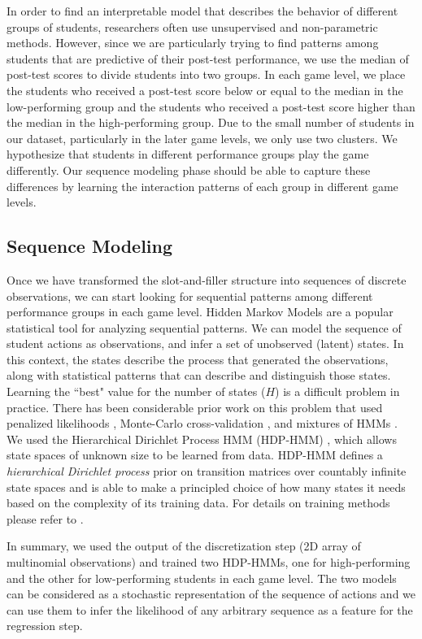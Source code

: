 \documentclass{sigchi}
\begin{document}
	In order to find an interpretable model that describes the behavior of different groups of students, researchers often use unsupervised and non-parametric methods. 
	However, since we are particularly trying to find patterns among students that are predictive of their post-test performance, we use the median of post-test scores to divide students into two groups. 
	In each game level, we place the students who received a post-test score below or equal to the median in the low-performing group and the students who received a post-test score higher than the median in the high-performing group.
	Due to the small number of students in our dataset, particularly in the later game levels, we only use two clusters. 
	We hypothesize that students in different performance groups play the game differently.
	Our sequence modeling phase should be able to capture
	these differences by learning the interaction patterns of each group in different game levels.

	
	\subsection{Sequence Modeling}
	Once we have transformed the slot-and-filler structure into sequences of discrete observations, we can start looking for sequential patterns among different performance groups in each game level.
	Hidden Markov Models are a popular statistical tool for analyzing sequential patterns.
	We can model the sequence of student actions as observations,
	and infer a set of unobserved (latent) states.
	In this context, the states describe the process that generated the observations, along with statistical patterns that can describe and distinguish those states.
	Learning the ``best" value for the number of states ($H$) is a difficult problem in practice. 
	There has been considerable prior work on this problem that used penalized likelihoods \cite{rabiner1989hmm}, Monte-Carlo cross-validation \cite{smyth1996clustering}, and mixtures of HMMs \cite{smyth1997clustering}.
	We used the Hierarchical Dirichlet Process HMM (HDP-HMM) \cite{fox2008hdp}, which allows state spaces of unknown size to be learned from data. 
	HDP-HMM defines a \textit{hierarchical Dirichlet process} prior on transition matrices over countably infinite state spaces and is able to make a principled choice of how many states it needs based on the complexity of its training data. 
	For details on training methods please refer to \cite{fox2008hdp}.
	
	In summary, we used the output of the discretization step (2D array of multinomial observations) and trained two HDP-HMMs, one for high-performing and the other for low-performing students in each game level. 
	The two models can be considered as a stochastic representation of the sequence of actions and we can use them to infer the likelihood of any arbitrary sequence as a feature for the regression step. 
	
\end{document}
